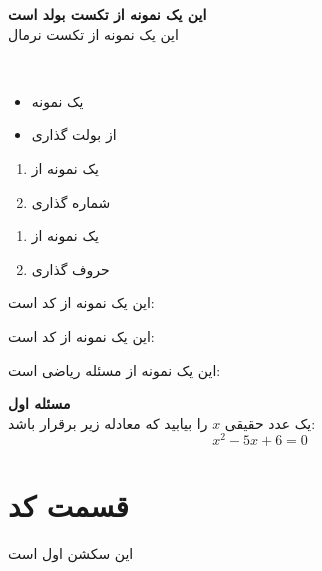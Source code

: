 \textbf{این یک نمونه از تکست بولد است}\\
این یک نمونه از تکست نرمال


\textbf{}\\



\begin{itemize}

    \item یک نمونه

    \item از بولت گذاری

\end{itemize}


\begin{enumerate}

    \item یک نمونه از

    \item شماره گذاری

\end{enumerate}

{
\renewcommand{\labelenumi}{\alph{enumi}.}
\begin{enumerate}

    \item یک نمونه از

    \item حروف گذاری

\end{enumerate}
}

این یک نمونه از کد  است:
\lr{}

این یک نمونه از کد  است:
\lr{}

این یک نمونه از مسئله ریاضی است:
\begin{mathbox}

\textbf{مسئله اول}\\
یک عدد حقیقی $x$ را بیابید که معادله زیر برقرار باشد:
$$x^2 - 5x + 6 = 0$$

\end{mathbox}

\section{قسمت کد}
این سکشن اول است

